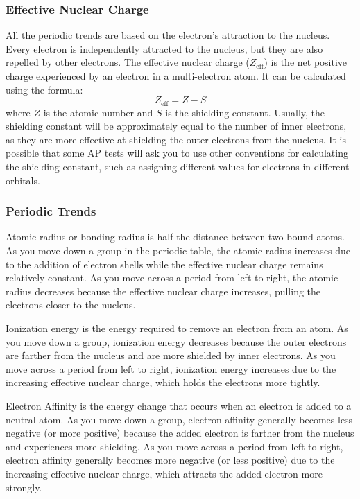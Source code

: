 \subsubsection{Effective Nuclear Charge}
All the periodic trends are based on the electron's attraction to the nucleus. Every electron is independently attracted to the nucleus, but they are also repelled by other electrons. The effective nuclear charge ($Z_{\text{eff}}$) is the net positive charge experienced by an electron in a multi-electron atom. It can be calculated using the formula:
\begin{equation}\label{eq:zeff}
    Z_{\text{eff}} = Z - S
\end{equation}
where $Z$ is the atomic number and $S$ is the shielding constant. Usually, the shielding constant will be approximately equal to the number of inner electrons, as they are more effective at shielding the outer electrons from the nucleus. It is possible that some AP tests will ask you to use other conventions for calculating the shielding constant, such as assigning different values for electrons in different orbitals. 
\subsubsection{Periodic Trends}
Atomic radius or bonding radius is half the distance between two bound atoms. As you move down a group in the periodic table, the atomic radius increases due to the addition of electron shells while the effective nuclear charge remains relatively constant. As you move across a period from left to right, the atomic radius decreases because the effective nuclear charge increases, pulling the electrons closer to the nucleus.

Ionization energy is the energy required to remove an electron from an atom. As you move down a group, ionization energy decreases because the outer electrons are farther from the nucleus and are more shielded by inner electrons. As you move across a period from left to right, ionization energy increases due to the increasing effective nuclear charge, which holds the electrons more tightly.

Electron Affinity is the energy change that occurs when an electron is added to a neutral atom. As you move down a group, electron affinity generally becomes less negative (or more positive) because the added electron is farther from the nucleus and experiences more shielding. As you move across a period from left to right, electron affinity generally becomes more negative (or less positive) due to the increasing effective nuclear charge, which attracts the added electron more strongly. 

